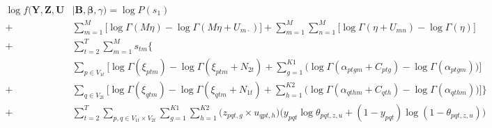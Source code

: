 \documentclass{article}
\begin{document}
\begin{equation}
    \begin{aligned}
\log f(\mathbf{Y}, \mathbf{Z},  \mathbf{U} & \mid \mathbf{B}, \boldsymbol{\beta}, \gamma) = \log P(s_1) \\
+ & \sum_{m=1}^{M} \Bigg[ \log \Gamma(M\eta) - \log \Gamma(M\eta + U_{m\cdot}) \Bigg] + \sum_{m=1}^{M} \sum_{n=1}^{M} \Bigg[ \log \Gamma(\eta + U_{mn}) - \log \Gamma(\eta) \Bigg] \\
+ & \sum_{t=2}^{T} \sum_{m=1}^{M} s_{tm} \Bigg\{\\
& \sum_{p \in V_{1t}} \Bigg[ \log \Gamma(\xi_{ptm}) - \log \Gamma(\xi_{ptm} + N_{2t}) + \sum_{g=1}^{K1} \bigg( \log \Gamma(\alpha_{ptgm} + C_{ptg}) - \log \Gamma(\alpha_{ptgm}) \bigg) \Bigg] \\
+ & \sum_{q \in V_{2t}} \Bigg[ \log \Gamma(\xi_{qtm}) - \log \Gamma(\xi_{qtm} + N_{1t}) + \sum_{h=1}^{K2} \bigg( \log \Gamma(\alpha_{qthm} + C_{qth}) - \log \Gamma(\alpha_{qthm}) \bigg) \Bigg] \Bigg\} \\
+ & \sum_{t=2}^{T} \sum_{p,q \in V_{1t} \times V_{2t}} \sum_{g=1}^{K1} \sum_{h=1}^{K2} \big( z_{pqt,g} \times u_{qpt,h}\big) \bigg( y_{pqt} \log \theta_{pqt,z,u} + (1-y_{pqt}) \log (1 - \theta_{pqt,z,u}) \bigg)
\end{aligned}
\end{equation}

\end{document}
